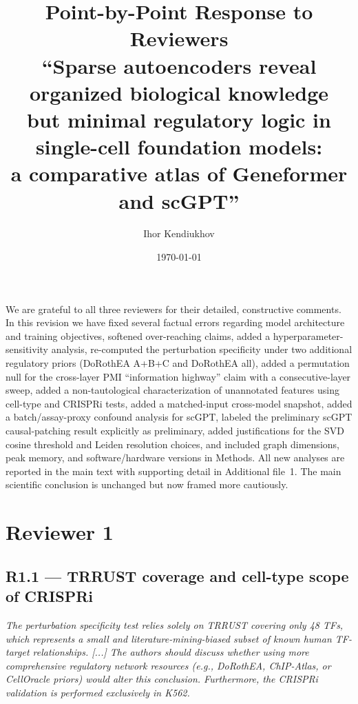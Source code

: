 \documentclass[11pt]{article}
\title{Point-by-Point Response to Reviewers\\[6pt]
\large ``Sparse autoencoders reveal organized biological knowledge\\but minimal regulatory logic in single-cell foundation models:\\a comparative atlas of Geneformer and scGPT''}
\author{Ihor Kendiukhov}
\date{\today}
\newcommand{\reviewercomment}[1]{\textit{\color{gray}#1}}
\begin{document}
\maketitle

We are grateful to all three reviewers for their detailed, constructive comments. In this revision we have fixed several factual errors regarding model architecture and training objectives, softened over-reaching claims, added a hyperparameter-sensitivity analysis, re-computed the perturbation specificity under two additional regulatory priors (DoRothEA A+B+C and DoRothEA all), added a permutation null for the cross-layer PMI ``information highway'' claim with a consecutive-layer sweep, added a non-tautological characterization of unannotated features using cell-type and CRISPRi tests, added a matched-input cross-model snapshot, added a batch/assay-proxy confound analysis for scGPT, labeled the preliminary scGPT causal-patching result explicitly as preliminary, added justifications for the SVD cosine threshold and Leiden resolution choices, and included graph dimensions, peak memory, and software/hardware versions in Methods. All new analyses are reported in the main text with supporting detail in Additional file~1. The main scientific conclusion is unchanged but now framed more cautiously.

\bigskip

\section*{Reviewer 1}

\subsection*{R1.1 --- TRRUST coverage and cell-type scope of CRISPRi}
\reviewercomment{The perturbation specificity test relies solely on TRRUST covering only 48 TFs, which represents a small and literature-mining-biased subset of known human TF-target relationships. [...] The authors should discuss whether using more comprehensive regulatory network resources (e.g., DoRothEA, ChIP-Atlas, or CellOracle priors) would alter this conclusion. Furthermore, the CRISPRi validation is performed exclusively in K562.}
\end{document}
